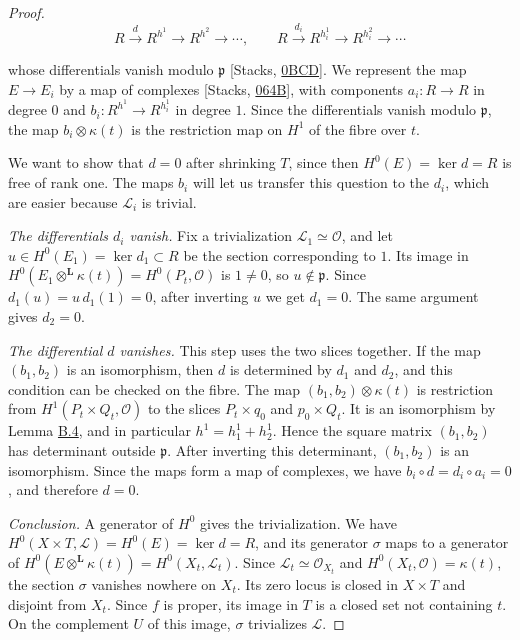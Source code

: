 \documentclass[11pt]{article}
\begin{document}
\begin{proof}[{Proof}]
\[
R\xrightarrow{d}R^{h^1}\to R^{h^2}\to\cdots,\qquad
R\xrightarrow{d_i}R^{h_i^1}\to R^{h_i^2}\to\cdots
\]

whose differentials vanish modulo \(\mathfrak p\) [Stacks, \href{https://stacks.math.columbia.edu/tag/0BCD}{0BCD}]. We represent the map \(E\to E_i\) by a map of complexes [Stacks, \href{https://stacks.math.columbia.edu/tag/064B}{064B}], with components \(a_i:R\to R\) in degree \(0\) and \(b_i:R^{h^1}\to R^{h_i^1}\) in degree \(1\). Since the differentials vanish modulo \(\mathfrak p\), the map \(b_i\otimes\kappa(t)\) is the restriction map on \(H^1\) of the fibre over \(t\).

We want to show that \(d=0\) after shrinking \(T\), since then \(H^0(E)=\ker d=R\) is free of rank one. The maps \(b_i\) will let us transfer this question to the \(d_i\), which are easier because \(\mathcal L_i\) is trivial.

\emph{The differentials \(d_i\) vanish.} Fix a trivialization \(\mathcal L_1\simeq\mathcal O\), and let \(u\in H^0(E_1)=\ker d_1\subset R\) be the section corresponding to \(1\). Its image in \(H^0(E_1\otimes^{\mathbf L}\kappa(t))=H^0(P_t,\mathcal O)\) is \(1\ne0\), so \(u\notin\mathfrak p\). Since \(d_1(u)=u\,d_1(1)=0\), after inverting \(u\) we get \(d_1=0\). The same argument gives \(d_2=0\).

\emph{The differential \(d\) vanishes.} This step uses the two slices together. If the map \((b_1,b_2)\) is an isomorphism, then \(d\) is determined by \(d_1\) and \(d_2\), and this condition can be checked on the fibre. The map \((b_1,b_2)\otimes\kappa(t)\) is restriction from \(H^1(P_t\times Q_t,\mathcal O)\) to the slices \(P_t\times q_0\) and \(p_0\times Q_t\). It is an isomorphism by Lemma \hyperref[bp12]{B.4}, and in particular \(h^1=h_1^1+h_2^1\). Hence the square matrix \((b_1,b_2)\) has determinant outside \(\mathfrak p\). After inverting this determinant, \((b_1,b_2)\) is an isomorphism. Since the maps form a map of complexes, we have \(b_i\circ d=d_i\circ a_i=0\), and therefore \(d=0\).

\emph{Conclusion.} A generator of \(H^0\) gives the trivialization. We have \(H^0(X\times T,\mathcal L)=H^0(E)=\ker d=R\), and its generator \(\sigma\) maps to a generator of \(H^0(E\otimes^{\mathbf L}\kappa(t))=H^0(X_t,\mathcal L_t)\). Since \(\mathcal L_t\simeq\mathcal O_{X_t}\) and \(H^0(X_t,\mathcal O)=\kappa(t)\), the section \(\sigma\) vanishes nowhere on \(X_t\). Its zero locus is closed in \(X\times T\) and disjoint from \(X_t\). Since \(f\) is proper, its image in \(T\) is a closed set not containing \(t\). On the complement \(U\) of this image, \(\sigma\) trivializes \(\mathcal L\).
\end{proof}
\end{document}
